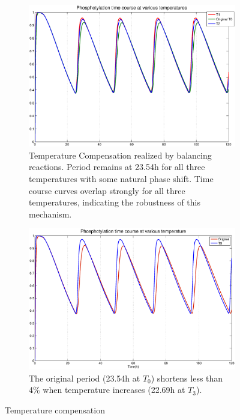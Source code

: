 \documentclass[a4paper,10pt]{article}
\numberwithin{equation}{section}
\begin{document}
\begin{figure}
\centering
\begin{subfigure}{0.8\textwidth}
\centering
\includegraphics[scale=0.3]{fixedperiod1.eps}
\caption{\selectfont Temperature Compensation realized by balancing reactions. Period remains at 23.54h for all three temperatures with some natural phase shift. Time course curves overlap strongly for all three temperatures, indicating the robustness of this mechanism.}\label{fig:fixedperiod1}
\end{subfigure}
\begin{subfigure}{0.8\textwidth}
\centering
\includegraphics[scale=0.3]{fixedperiod2.eps}
\caption{\selectfont The original period (23.54h at $T_0$) shortens less than 4\% when temperature increases (22.69h at $T_3$). }\label{fig:fixedperiod2}
\end{subfigure}
\caption{Temperature compensation}
\end{figure}
\end{document}
